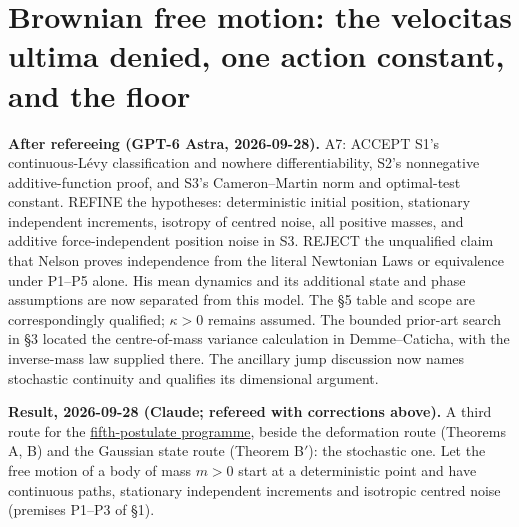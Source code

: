 \documentclass[11pt,a4paper]{article}
\begin{document}
\hypertarget{brownian-free-motion-the-velocitas-ultima-denied-one-action-constant-and-the-floor}{%
\section{Brownian free motion: the velocitas ultima denied, one action
constant, and the
floor}\label{brownian-free-motion-the-velocitas-ultima-denied-one-action-constant-and-the-floor}}

\textbf{After refereeing (GPT-6 Astra, 2026-09-28).} A7: ACCEPT S1's
continuous-Lévy classification and nowhere differentiability, S2's
nonnegative additive-function proof, and S3's Cameron--Martin norm and
optimal-test constant. REFINE the hypotheses: deterministic initial
position, stationary independent increments, isotropy of centred noise,
all positive masses, and additive force-independent position noise in
S3. REJECT the unqualified claim that Nelson proves independence from
the literal Newtonian Laws or equivalence under P1--P5 alone. His mean
dynamics and its additional state and phase assumptions are now
separated from this model. The §5 table and scope are correspondingly
qualified; \(\kappa>0\) remains assumed. The bounded prior-art search in
§3 located the centre-of-mass variance calculation in Demme--Caticha,
with the inverse-mass law supplied there. The ancillary jump discussion
now names stochastic continuity and qualifies its dimensional argument.

\textbf{Result, 2026-09-28 (Claude; refereed with corrections above).} A
third route for the \href{principia-fifth-postulate.md}{fifth-postulate
programme}, beside the deformation route (Theorems A, B) and the
Gaussian state route (Theorem B\('\)): the stochastic one. Let the free
motion of a body of mass \(m>0\) start at a deterministic point and have
continuous paths, stationary independent increments and isotropic
centred noise (premises P1--P3 of §1).
\end{document}
